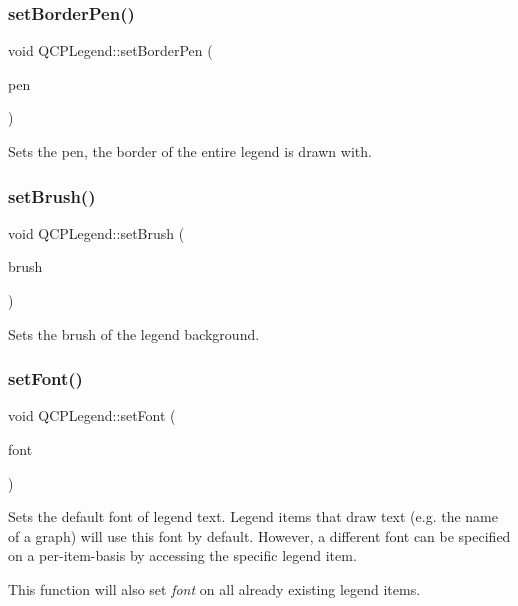 \subsubsection{\texorpdfstring{set\+Border\+Pen()}{setBorderPen()}}
{\footnotesize\ttfamily void Q\+C\+P\+Legend\+::set\+Border\+Pen (\begin{DoxyParamCaption}\item[{const Q\+Pen \&}]{pen }\end{DoxyParamCaption})}

Sets the pen, the border of the entire legend is drawn with. \mbox{\label{class_q_c_p_legend_a497bbcd38baa3598c08e2b3f48103f23}} 
\subsubsection{\texorpdfstring{set\+Brush()}{setBrush()}}
{\footnotesize\ttfamily void Q\+C\+P\+Legend\+::set\+Brush (\begin{DoxyParamCaption}\item[{const Q\+Brush \&}]{brush }\end{DoxyParamCaption})}

Sets the brush of the legend background. \mbox{\label{class_q_c_p_legend_aa4cda8499e3cb0f3be415edc02984c73}} 
\subsubsection{\texorpdfstring{set\+Font()}{setFont()}}
{\footnotesize\ttfamily void Q\+C\+P\+Legend\+::set\+Font (\begin{DoxyParamCaption}\item[{const Q\+Font \&}]{font }\end{DoxyParamCaption})}

Sets the default font of legend text. Legend items that draw text (e.\+g. the name of a graph) will use this font by default. However, a different font can be specified on a per-\/item-\/basis by accessing the specific legend item.

This function will also set {\itshape font} on all already existing legend items.

